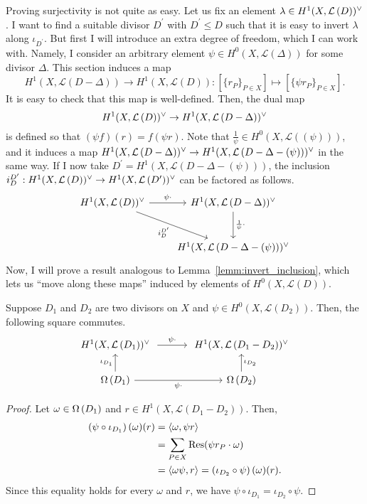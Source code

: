Proving surjectivity is not quite as easy. Let us fix an element $\lambda
\in H^1(X,\mathcal{L}\left(D\right))^{\vee}$. I want to find a suitable divisor $D^{\prime}$ with
$D^{\prime}\leq D$ such that it is easy to invert $\lambda$ along
$\iota_{D^{\prime}}$. But first I will introduce an extra degree of freedom,
which I can work with. Namely, I consider an arbitrary element $\psi\in
H^{0}(X,\mathcal{L}(\Delta))$ for some divisor $\Delta$. This section induces
a map
\[H^{1}(X,\mathcal{L}(D-\Delta))\to H^{1}(X,\mathcal{L}(D))
:[\{r_{P}\}_{P\in X}]\mapsto [\{\psi r_{P}\}_{P\in X}].\]
It is easy to check that this map is well-defined. Then, the dual map
\[H^1(X,\mathcal{L}\left(D\right))^{\vee}\to H^1(X,\mathcal{L}\left(D-\Delta\right))^{\vee}\]
is defined so that $(\psi f)(r) =f(\psi r)$. Note that $\frac1{\psi}
\in H^{0}(X,\mathcal{L}((\psi)))$,
and it induces a map $H^1(X,\mathcal{L}\left(D-\Delta\right))^{\vee}\to H^1(X,\mathcal{L}\left(D-\Delta-(\psi)\right))^{\vee}$ in the same
way. If I now take $D^{\prime}=H^{1}(X,\mathcal{L}(D-\Delta-(\psi)))$,
the inclusion $i_{D}^{D^{\prime}}:H^1(X,\mathcal{L}\left(D\right))^{\vee}\to H^1(X,\mathcal{L}\left(D^{\prime}\right))^{\vee}$ can be
factored as follows.
\[\begin{tikzcd}[row sep=large]
    \dual{D}\rar["\psi\cdot"]\drar["i_{D}^{D^{\prime}}"']
    & \dual{D-\Delta}\dar["\frac1{\psi}\cdot"] \\ & \dual{D-\Delta-(\psi)}
  \end{tikzcd}\]
Now, I will prove a result analogous to Lemma~\ref{lemm:invert_inclusion},
which lets us ``move along these maps'' induced by elements of
$H^{0}(X,\mathcal{L}(D))$.
\begin{lemm}\label{lemm:invert_multiplication}
  Suppose $D_{1}$ and $D_{2}$ are two divisors on $X$ and $\psi
  \in H^{0}(X,\mathcal{L}(D_{2}))$. Then, the following square commutes.
  \[\begin{tikzcd}[column sep=large]
      \dual{D_{1}}\rar[shorten=.3em,"\psi\cdot"] & \dual{D_{1}-D_{2}} \\
      \diffs{D_{1}}\rar["\psi\cdot"']\uar["\iota_{D_{1}}"]
      & \diffs{D_{2}}\uar["\iota_{D_{2}}"']
    \end{tikzcd}\]
\end{lemm}
\begin{proof}
  Let $\omega\in\Omega\left(D_{1}\right)$ and $r\in H^{1}(X,\mathcal{L}(D_{1}-D_{2}))$.
  Then,
  \begin{align*}
    \left(\psi\circ\iota_{D_{1}}\right)(\omega)(r)
    &= \langle \omega, \psi r\rangle \\
    &= \sum_{P\in X}\operatorname{Res}(\psi r_{P}\cdot\omega) \\
    &= \langle \omega\psi, r\rangle=\left(\iota_{D_{2}}\circ\psi\right)
      (\omega)(r).
  \end{align*}
  Since this equality holds for every $\omega$ and $r$, we have
  $\psi\circ\iota_{D_{1}}=\iota_{D_{2}}\circ\psi$.
\end{proof}


